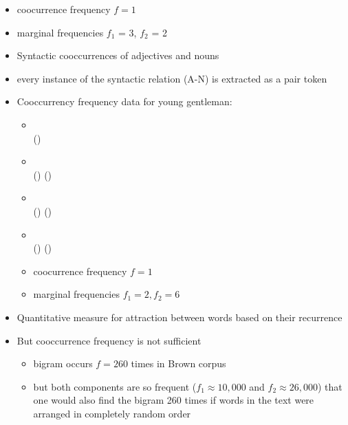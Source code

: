 \documentclass[a4paper,landscape,headrule,footrule,dvips]{foils}
\begin{document}
\begin{CJK}{UTF8}{min}
\begin{itemize}
\item coocurrence frequency $f = 1$
\item marginal frequencies $f_1$ = 3, $f_2$ = 2
\end{itemize}


\begin{itemize}
\item Syntactic cooccurrences of adjectives and nouns
\item every instance of the syntactic relation (A-N) is
extracted as a pair token
\end{itemize}



\begin{itemize}
\item  Cooccurrency frequency data for young gentleman:
  \begin{small}
    \begin{itemize}
    \item {}  \\ ()
    \item {}  \\ () ()
    \item {}  \\ ()
      ()
    \item {}  
      \\ () ()
    \end{itemize}
  \end{small}
 \begin{itemize}
    \item coocurrence frequency $f = 1$
    \item marginal frequencies $f_1 = 2, f_2 = 6$
\end{itemize}
\end{itemize}
\begin{itemize}
\item Quantitative measure for attraction between words based
on their recurrence \into {}
\item 
But cooccurrence frequency is not sufficient
\begin{itemize}
\item bigram  occurs $f = 260$ times in Brown corpus
\item but both components are so frequent ($f_1 \approx   10,000$ and
$f_2 \approx   26,000$) that one would also find the bigram 260 times if
words in the text were arranged in completely random order


\end{itemize}
\end{itemize}
\end{CJK}
\end{document}
